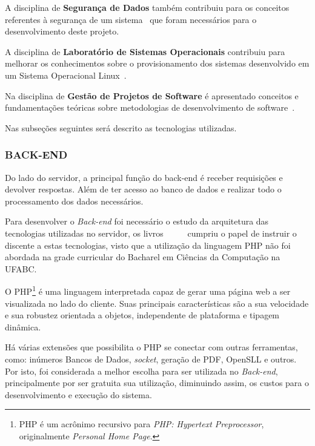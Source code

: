 \documentclass[
  12pt,            %
  openany,
  oneside,
  a4paper,         %
  english,      %
  brazil
]{article}
\numberwithin{figure}{section}
\numberwithin{table}{section}
\newcounter{subsubsubsection}[subsubsection]
\begin{document}
A disciplina de \textbf{Segurança de Dados} também contribuiu para os conceitos referentes à segurança de um sistema~\cite{SegDados} que foram necessários para o desenvolvimento deste projeto.

A disciplina de \textbf{Laboratório de Sistemas Operacionais} contribuiu para melhorar os conhecimentos sobre o provisionamento dos sistemas desenvolvido em um Sistema Operacional Linux~\cite{tanenbaum1995sistemas}.

Na disciplina de \textbf{ Gestão de Projetos de Software} é apresentado conceitos e fundamentações teóricas sobre metodologias de desenvolvimento de software~\cite{kerzner2006gestao}\cite{vargas2005gerenciamento}.

Nas subseções seguintes será descrito as tecnologias utilizadas.

\subsubsection{BACK-END}
Do lado do servidor, a principal função do back-end é receber requisições e devolver respostas. Além de ter acesso ao banco de dados e realizar todo o processamento dos dados necessários.

Para desenvolver o \textit{Back-end} foi necessário o estudo da arquitetura das tecnologias utilizadas no servidor, os livros~\cite{PHP_Novatec_poo}~\cite{PHP_Novatec_dev}~\cite{PHP_Novatec_appWeb}~\cite{PHP_mysql}~\cite{PHP_Novatec_ajax} cumpriu o papel de instruir o discente a estas tecnologias, visto que a utilização da linguagem PHP não foi abordada na grade curricular do Bacharel em Ciências da Computação na UFABC.


O PHP\footnote{PHP é um acrônimo recursivo para \textit{PHP: Hypertext Preprocessor}, originalmente \textit{Personal Home Page}.} é uma linguagem interpretada capaz de gerar uma página web a ser visualizada no lado do cliente. Suas principais características são a sua velocidade e sua robustez orientada a objetos, independente de plataforma e tipagem dinâmica.

Há várias extensões que possibilita o PHP se conectar com outras ferramentas, como: inúmeros Bancos de Dados, \textit{socket}, geração de PDF, OpenSLL e outros. Por isto, foi considerada a melhor escolha para ser utilizada no \textit{Back-end}, principalmente por ser gratuita sua utilização, diminuindo assim, os custos para o desenvolvimento e execução do sistema.
\end{document}
